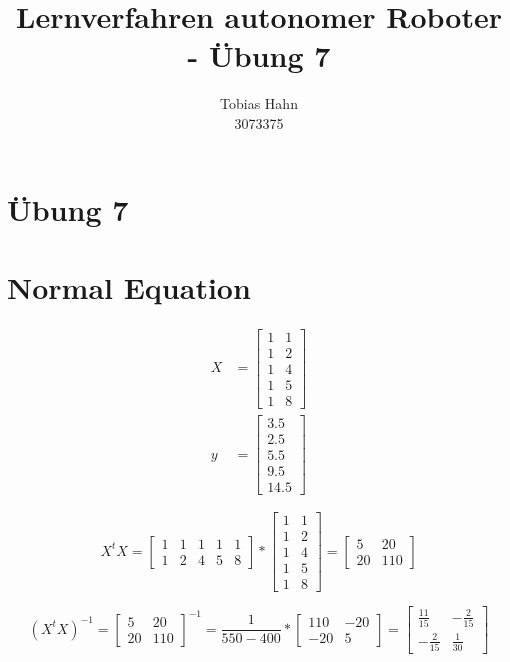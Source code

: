 \documentclass{article}
\title{Lernverfahren autonomer Roboter - Übung 7}
\author{Tobias Hahn\\ 3073375}
\begin{document}
\maketitle
\newpage
\section*{Übung 7}
\section{Normal Equation}

\begin{equation}
	\begin{split}
	X & = 
		\begin{bmatrix}
			1 & 1 \\
			1 & 2 \\
			1 & 4 \\
			1 & 5 \\
			1 & 8 
		\end{bmatrix} \\
	y & = 
		\begin{bmatrix}
			3.5 \\
			2.5 \\
			5.5 \\
			9.5 \\
			14.5
		\end{bmatrix}
	\end{split}
\end{equation}

\begin{equation}
	X^t X = 
	\begin{bmatrix}
		1 & 1 & 1 & 1 & 1 \\
		1 & 2 & 4 & 5 & 8
	\end{bmatrix} * 
	\begin{bmatrix}
		1 & 1 \\
		1 & 2 \\
		1 & 4 \\
		1 & 5 \\
		1 & 8 
	\end{bmatrix} =
	\begin{bmatrix}
		5 & 20 \\
		20 & 110
	\end{bmatrix}
\end{equation}

\begin{equation}
	(X^t X)^{-1} = 
	\begin{bmatrix}
		5 & 20 \\
		20 & 110
	\end{bmatrix}^{-1} =  
	\frac{1}{550-400} *
	\begin{bmatrix}
		110 & -20 \\
		-20 & 5
	\end{bmatrix} = 
	\begin{bmatrix}
		\frac{11}{15} & -\frac{2}{15} \\
		-\frac{2}{15} & \frac{1}{30}
	\end{bmatrix}
\end{equation}
\end{document}
